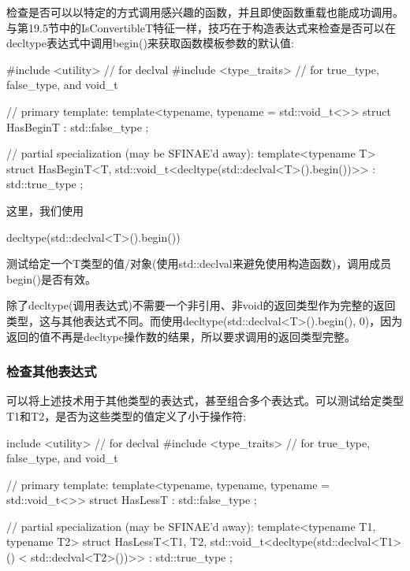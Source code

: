 检查是否可以以特定的方式调用感兴趣的函数，并且即使函数重载也能成功调用。与第19.5节中的IsConvertibleT特征一样，技巧在于构造表达式来检查是否可以在decltype表达式中调用begin()来获取函数模板参数的默认值:

\begin{cpp}
#include <utility> // for declval
#include <type_traits> // for true_type, false_type, and void_t

// primary template:
template<typename, typename = std::void_t<>>
struct HasBeginT : std::false_type {
};

// partial specialization (may be SFINAE’d away):
template<typename T>
struct HasBeginT<T, std::void_t<decltype(std::declval<T>().begin())>>
: std::true_type {
};
\end{cpp}

这里，我们使用

\begin{cpp}
decltype(std::declval<T>().begin())
\end{cpp}

测试给定一个T类型的值/对象(使用std::declval来避免使用构造函数)，调用成员begin()是否有效。

\begin{notice}
除了decltype(调用表达式)不需要一个非引用、非void的返回类型作为完整的返回类型，这与其他表达式不同。而使用decltype(std::declval<T>().begin(), 0)，因为返回的值不再是decltype操作数的结果，所以要求调用的返回类型完整。
\end{notice}

\subsubsection{检查其他表达式}

可以将上述技术用于其他类型的表达式，甚至组合多个表达式。可以测试给定类型T1和T2，是否为这些类型的值定义了小于操作符:

\begin{cpp}
include <utility> // for declval
#include <type_traits> // for true_type, false_type, and void_t

// primary template:
template<typename, typename, typename = std::void_t<>>
struct HasLessT : std::false_type
{
};

// partial specialization (may be SFINAE’d away):
template<typename T1, typename T2>
struct HasLessT<T1, T2, std::void_t<decltype(std::declval<T1>()
					< std::declval<T2>())>>
: std::true_type
{
};
\end{cpp}

